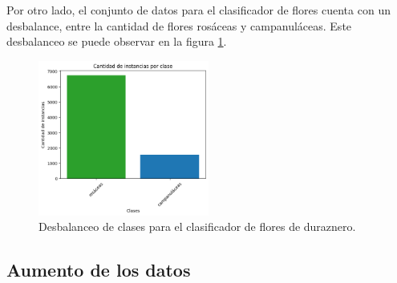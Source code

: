 Por otro lado, el conjunto de datos para el clasificador de flores cuenta con un desbalance, entre la cantidad de flores rosáceas y campanuláceas. Este desbalanceo se puede observar en la figura \ref{fig:desbalanceoClass}.

\begin{figure}[ht]
	\centering
	\includegraphics[width=0.5\textwidth, height=0.5\textwidth]{./Figures/tipodeflor_desbalance.png}
	\caption{Desbalanceo de clases para el clasificador de flores de duraznero.}
	\label{fig:desbalanceoClass}
\end{figure}

\subsection{Aumento de los datos}

